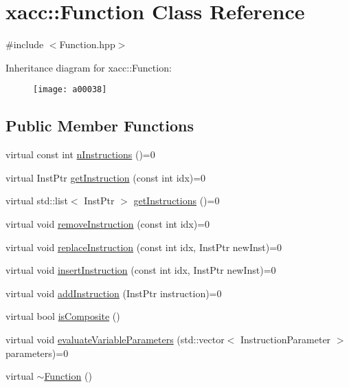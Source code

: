 \hypertarget{a00038}{}\section{xacc\+:\+:Function Class Reference}
\label{a00038}


{\ttfamily \#include $<$Function.\+hpp$>$}

Inheritance diagram for xacc\+:\+:Function\+:\begin{figure}[H]
\begin{center}
\leavevmode
\texttt{[image: a00038]}
\end{center}
\end{figure}
\subsection*{Public Member Functions}
\begin{DoxyCompactItemize}
\item 
virtual const int \hyperlink{a00038_a8901985525f59713e14c61713e07c086}{n\+Instructions} ()=0
\item 
virtual Inst\+Ptr \hyperlink{a00038_afa549fc91b5a05f26d8139954a7e0ed5}{get\+Instruction} (const int idx)=0
\item 
virtual std\+::list$<$ Inst\+Ptr $>$ \hyperlink{a00038_aaf80bd3d49113a92b520785572663032}{get\+Instructions} ()=0
\item 
virtual void \hyperlink{a00038_ab6478b09bb28e194bb555b3180737733}{remove\+Instruction} (const int idx)=0
\item 
virtual void \hyperlink{a00038_a2ef6a4923a6734f90f6ee3d94d263af0}{replace\+Instruction} (const int idx, Inst\+Ptr new\+Inst)=0
\item 
virtual void \hyperlink{a00038_acde702e44bdbc2759b338365218d7ebe}{insert\+Instruction} (const int idx, Inst\+Ptr new\+Inst)=0
\item 
virtual void \hyperlink{a00038_aa8c9ec2d08be75c69399d4254b0216f5}{add\+Instruction} (Inst\+Ptr instruction)=0
\item 
virtual bool \hyperlink{a00038_aa75500c657b5c3e0e36213e1506aad97}{is\+Composite} ()
\item 
virtual void \hyperlink{a00038_af6ae9453027789a2aaec30e59c9e45e3}{evaluate\+Variable\+Parameters} (std\+::vector$<$ Instruction\+Parameter $>$ parameters)=0
\item 
virtual \hyperlink{a00038_a04b25ba4da1ddfa4ec4ec6d6ffb25bc3}{$\sim$\+Function} ()
\end{DoxyCompactItemize}

